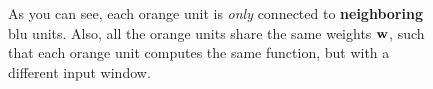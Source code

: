 \documentclass[12pt]{report}
\theoremstyle{plain}
\begin{document}
\begin{flushleft}
\begin{figure}[!h]
\begin{minipage}{0.5\textwidth}
	\end{minipage}
	\begin{minipage}{0.5\textwidth}
		As you can see, each orange unit is \textit{only} connected to \textbf{neighboring} blu units. Also, all the orange units share the same weights $\vb{w}$, such that each orange unit computes the same function, but with a different input window.
	\end{minipage}
\end{figure}






























\end{flushleft}
\end{document}
